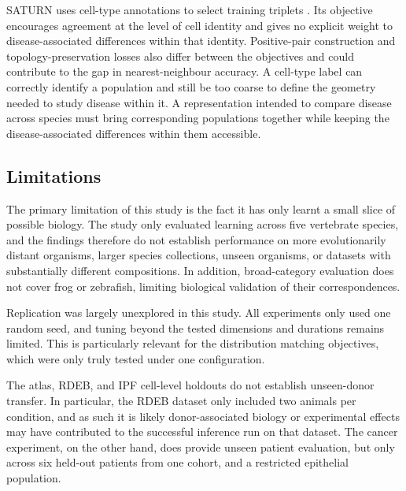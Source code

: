 \documentclass{article}
\begin{document}
SATURN uses cell-type annotations to select training triplets \cite{SATURN}. Its objective encourages agreement at the level of cell identity and gives no explicit weight to disease-associated differences within that identity. Positive-pair construction and topology-preservation losses also differ between the objectives and could contribute to the gap in nearest-neighbour accuracy. A cell-type label can correctly identify a population and still be too coarse to define the geometry needed to study disease within it. A representation intended to compare disease across species must bring corresponding populations together while keeping the disease-associated differences within them accessible.

\subsection{Limitations}
The primary limitation of this study is the fact it has only learnt a small slice of possible biology. The study only evaluated learning across five vertebrate species, and the findings therefore do not establish performance on more evolutionarily distant organisms, larger species collections, unseen organisms, or datasets with substantially different compositions. In addition, broad-category evaluation does not cover frog or zebrafish, limiting biological validation of their correspondences.

Replication was largely unexplored in this study. All experiments only used one random seed, and tuning beyond the tested dimensions and durations remains limited. This is particularly relevant for the distribution matching objectives, which were only truly tested under one configuration.

The atlas, RDEB, and IPF cell-level holdouts do not establish unseen-donor transfer. In particular, the RDEB dataset only included two animals per condition, and as such it is likely donor-associated biology or experimental effects may have contributed to the successful inference run on that dataset. The cancer experiment, on the other hand, does provide unseen patient evaluation, but only across six held-out patients from one cohort, and a restricted epithelial population. 
\end{document}

